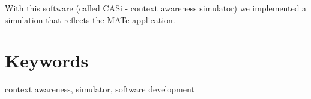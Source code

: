 \documentclass[11pt,    %
  english,ngerman,      %
  paper=a4,             %
  oneside,              %
  tablecaptionbelow,    %
  DIV=calc              %
  ]{scrbook}            %
\begin{document}
With this software (called CASi - context awareness simulator) we implemented a simulation that reflects the MATe application.

\vfill

\section*{Keywords} context awareness, simulator, software development

\clearpage
\setcounter{tocdepth}{1}
\tableofcontents

\mainmatter













\end{document}
